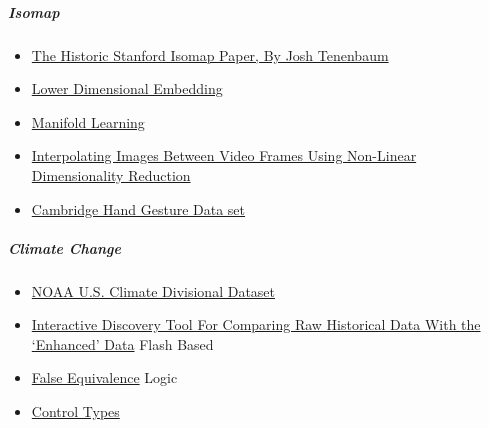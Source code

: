 \documentclass[11pt]{article}
\providecommand{\tightlist}{%
      \setlength{\itemsep}{0pt}\setlength{\parskip}{0pt}}
\begin{document}
\hypertarget{isomap}{%
\subparagraph{Isomap}\label{isomap}}

\begin{itemize}
\tightlist
\item
  \href{http://web.mit.edu/cocosci/Papers/sci_reprint.pdf}{The Historic
  Stanford Isomap Paper, By Josh Tenenbaum}
\item
  \href{https://en.wikipedia.org/wiki/Nonlinear_dimensionality_reduction}{Lower
  Dimensional Embedding}
\item
  \href{https://www.quora.com/What-is-the-Isomap-algorithm}{Manifold
  Learning}
\item
  \href{http://cs229.stanford.edu/proj2012/ElGhazzalRobaszkiewicz-InterpolatingImagesBetweenVideoFramesUsingNonLinearDimensionalityReduction.pdf}{Interpolating
  Images Between Video Frames Using Non-Linear Dimensionality Reduction}
\item
  \href{}{Cambridge Hand Gesture Data set}
\end{itemize}

\hypertarget{climate-change}{%
\subparagraph{Climate Change}\label{climate-change}}

\begin{itemize}
\tightlist
\item
  \href{https://www.ncdc.noaa.gov/monitoring-references/maps/us-climate-divisions.php}{NOAA
  U.S. Climate Divisional Dataset}
\item
  \href{https://www.ncdc.noaa.gov/temp-and-precip/divisional-comparison/}{Interactive
  Discovery Tool For Comparing Raw Historical Data With the `Enhanced'
  Data} \textbar{} Flash Based
\item
  \href{http://fusion.net/story/341420/the-maddening-world-of-false-equivalence-media-from-a-climate-reporter-who-knows/}{False
  Equivalence} \textbar{} Logic
\item
  \href{https://en.wikipedia.org/wiki/Scientific_control\#Types_of_control}{Control
  Types}
\end{itemize}


    
    
    
    
\end{document}
